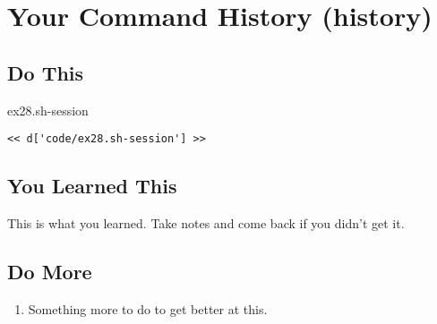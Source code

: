 \chapter{Your Command History (history)}

\section{Do This}

\begin{code}{ex28.sh-session}
\begin{Verbatim}
<< d['code/ex28.sh-session'] >>
\end{Verbatim}
\end{code}


\section{You Learned This}

This is what you learned.  Take notes and come back if you didn't get it.

\section{Do More}

\begin{enumerate}
\item Something more to do to get better at this.
\end{enumerate}

